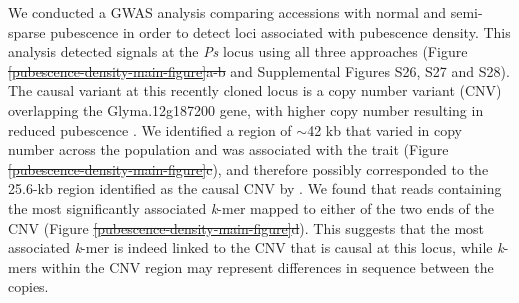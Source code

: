 \documentclass{article}
\providecommand{\DIFaddtex}[1]{{\protect\color{blue}\uwave{#1}}} %
\providecommand{\DIFdeltex}[1]{{\protect\color{red}\sout{#1}}}                      %
\providecommand{\DIFaddbegin}{} %
\providecommand{\DIFaddend}{} %
\providecommand{\DIFdelbegin}{} %
\providecommand{\DIFdelend}{} %
\providecommand{\DIFadd}[1]{\texorpdfstring{\DIFaddtex{#1}}{#1}} %
\providecommand{\DIFdel}[1]{\texorpdfstring{\DIFdeltex{#1}}{}} %
\newcommand{\DIFscaledelfig}{0.5}
\newlength{\DIFdelgraphicswidth} %
\newlength{\DIFdelgraphicsheight} %
\newcommand{\DIFaddincludegraphics}[2][]{{\color{blue}\fbox{\DIFOincludegraphics[#1]{#2}}}} %
\newcommand{\DIFdelincludegraphics}[2][]{%
\sbox{\DIFdelgraphicsbox}{\DIFOincludegraphics[#1]{#2}}%
\settoboxwidth{\DIFdelgraphicswidth}{\DIFdelgraphicsbox} %
\settoboxtotalheight{\DIFdelgraphicsheight}{\DIFdelgraphicsbox} %
\scalebox{\DIFscaledelfig}{%
\parbox[b]{\DIFdelgraphicswidth}{\usebox{\DIFdelgraphicsbox}\\[-\baselineskip] \rule{\DIFdelgraphicswidth}{0em}}\llap{\resizebox{\DIFdelgraphicswidth}{\DIFdelgraphicsheight}{%
\setlength{\unitlength}{\DIFdelgraphicswidth}%
\begin{picture}(1,1)%
\thicklines\linethickness{2pt} %
{\color[rgb]{1,0,0}\put(0,0){\framebox(1,1){}}}%
{\color[rgb]{1,0,0}\put(0,0){\line( 1,1){1}}}%
{\color[rgb]{1,0,0}\put(0,1){\line(1,-1){1}}}%
\end{picture}%
}\hspace*{3pt}}} %
} %
\DeclareRobustCommand{\DIFaddbegin}{\DIFOaddbegin \let\includegraphics\DIFaddincludegraphics} %
\DeclareRobustCommand{\DIFaddend}{\DIFOaddend \let\includegraphics\DIFOincludegraphics} %
\DeclareRobustCommand{\DIFdelbegin}{\DIFOdelbegin \let\includegraphics\DIFdelincludegraphics} %
\DeclareRobustCommand{\DIFdelend}{\DIFOaddend \let\includegraphics\DIFOincludegraphics} %
\begin{document}
We conducted a GWAS analysis comparing accessions with normal and semi-sparse
pubes\-cence in order to detect loci associated with pubescence density. This analysis
detected signals at the \textit{Ps} locus using all three approaches (Figure
\DIFdelbegin \DIFdel{\ref{pubescence-density-main-figure}a-b }\DIFdelend \DIFaddbegin \DIFadd{4a-b }\DIFaddend and Supplemental Figures S26, S27
and S28). The causal
variant at this recently cloned locus is a copy number variant (CNV) overlapping the
Glyma.12g187200 gene, with higher copy number resulting in reduced pubescence .
We identified a region of $\sim$42 kb that varied in copy number across
the population and was associated with the trait (Figure
\DIFdelbegin \DIFdel{\ref{pubescence-density-main-figure}c}\DIFdelend \DIFaddbegin \DIFadd{4c}\DIFaddend ), and therefore possibly corresponded to the
25.6-kb region identified as the causal CNV by . We found that
reads containing the most significantly associated \textit{k}-mer mapped to either of the two ends
of the CNV (Figure \DIFdelbegin \DIFdel{\ref{pubescence-density-main-figure}d}\DIFdelend \DIFaddbegin \DIFadd{4d}\DIFaddend ). This suggests that
the most associated \textit{k}-mer is indeed linked to the CNV
that is causal at this locus, while \textit{k}-mers within the
CNV region may represent differences in sequence between the copies.
\end{document}
